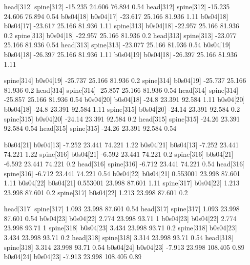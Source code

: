 head[312]    spine[312]    -15.235    24.606    76.894    0.54
head[312]    spine[312]    -15.235    24.606    76.894    0.54
b0s04[18]    b0s04[17]    -23.617    25.166    81.936    1.11
b0s04[18]    b0s04[17]    -23.617    25.166    81.936    1.11
spine[313]    b0s04[18]    -22.957    25.166    81.936    0.2
spine[313]    b0s04[18]    -22.957    25.166    81.936    0.2
head[313]    spine[313]    -23.077    25.166    81.936    0.54
head[313]    spine[313]    -23.077    25.166    81.936    0.54
b0s04[19]    b0s04[18]    -26.397    25.166    81.936    1.11
b0s04[19]    b0s04[18]    -26.397    25.166    81.936    1.11


spine[314]    b0s04[19]    -25.737    25.166    81.936    0.2
spine[314]    b0s04[19]    -25.737    25.166    81.936    0.2
head[314]    spine[314]    -25.857    25.166    81.936    0.54
head[314]    spine[314]    -25.857    25.166    81.936    0.54
b0s04[20]    b0s04[18]    -24.8    23.391    92.584    1.11
b0s04[20]    b0s04[18]    -24.8    23.391    92.584    1.11
spine[315]    b0s04[20]    -24.14    23.391    92.584    0.2
spine[315]    b0s04[20]    -24.14    23.391    92.584    0.2
head[315]    spine[315]    -24.26    23.391    92.584    0.54
head[315]    spine[315]    -24.26    23.391    92.584    0.54


b0s04[21]    b0s04[13]    -7.252    23.441    74.221    1.22
b0s04[21]    b0s04[13]    -7.252    23.441    74.221    1.22
spine[316]    b0s04[21]    -6.592    23.441    74.221    0.2
spine[316]    b0s04[21]    -6.592    23.441    74.221    0.2
head[316]    spine[316]    -6.712    23.441    74.221    0.54
head[316]    spine[316]    -6.712    23.441    74.221    0.54
b0s04[22]    b0s04[21]    0.553001    23.998    87.601    1.11
b0s04[22]    b0s04[21]    0.553001    23.998    87.601    1.11
spine[317]    b0s04[22]    1.213    23.998    87.601    0.2
spine[317]    b0s04[22]    1.213    23.998    87.601    0.2


head[317]    spine[317]    1.093    23.998    87.601    0.54
head[317]    spine[317]    1.093    23.998    87.601    0.54
b0s04[23]    b0s04[22]    2.774    23.998    93.71    1
b0s04[23]    b0s04[22]    2.774    23.998    93.71    1
spine[318]    b0s04[23]    3.434    23.998    93.71    0.2
spine[318]    b0s04[23]    3.434    23.998    93.71    0.2
head[318]    spine[318]    3.314    23.998    93.71    0.54
head[318]    spine[318]    3.314    23.998    93.71    0.54
b0s04[24]    b0s04[23]    -7.913    23.998    108.405    0.89
b0s04[24]    b0s04[23]    -7.913    23.998    108.405    0.89



